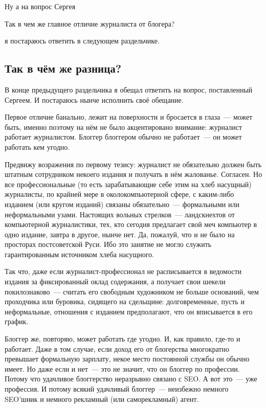 Ну а на вопрос Сергея


\begin{shadequote}{}
Так в чем же главное отличие журналиста от блогера?
\end{shadequote}

я постараюсь ответить в следующем раздельчике.

\subsection{Так в чём же разница?}

В конце предыдущего раздельчика я обещал ответить на вопрос, поставленный Сергеем. И постараюсь нынче исполнить своё обещание.

Первое отличие банально, лежит на поверхности и бросается в глаза~--- может быть, именно поэтому на нём не было акцентировано внимание: журналист работает журналистом. Блоггер блоггером обычно не работает~--- он может работать кем угодно.

Предвижу возражения по первому тезису: журналист не обязательно должен быть штатным сотрудником некоего издания и получать в нём жалованье. Согласен. Но все профессиональные (то есть зарабатывающие себе этим на хлеб насущный) журналисты, по крайней мере в околокомпьютерной сфере, с каким-либо изданием (или кругом изданий) связаны обязательно~--- формальными или неформальными узами. Настоящих вольных стрелков~--- ландскнехтов от компьютерной журналистики, тех, кто сегодня предлагает свой меч компьютер в одно издание, завтра в другое, нынче нет. Да, пожалуй, что и не было на просторах постсоветской Руси. Ибо это занятие не могло служить гарантированным источником хлеба насущного.

Так что, даже если журналист-профессионал не расписывается в ведомости издания за фиксированный оклад содержания, а получает свои шекели покилознаково~--- считать его свободным художником не больше оснований, чем проходчика или буровика, сидящего на сдельщине: долговременные, пусть и неформальные, отношения с изданием предполагают, что он вписывается в его график.

Блоггер же, повторяю, может работать где угодно. И, как правило, где-то и работает. Даже в том случае, если доход его от блогерства многократно превышает формальную зарплату, некое место постоянной службы он обычно имеет. Но даже если и нет~--- это не значит, что он блоггер по профессии. Потому что удачливое блоггерство неразрывно связано с SEO. А вот это~--- уже профессия. И потому всякий удачливый блоггер~--- неизбежно немного SEO'шник и немного рекламный (или саморекламный) агент.

